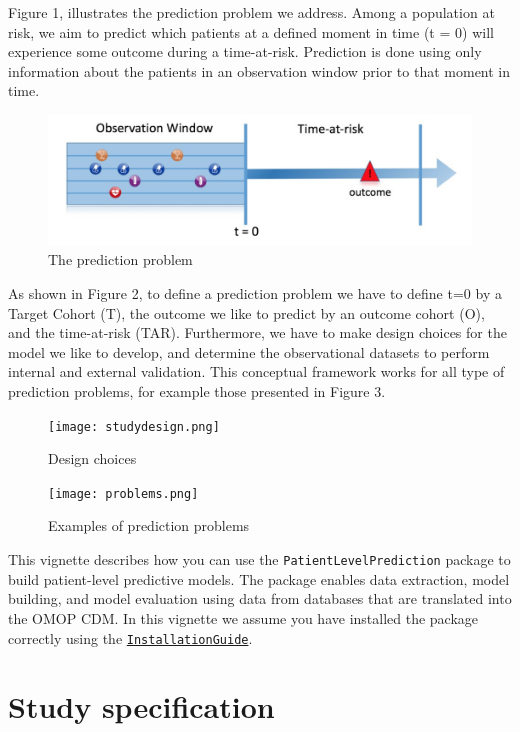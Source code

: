 \documentclass[
]{article}
\begin{document}
Figure 1, illustrates the prediction problem we address. Among a
population at risk, we aim to predict which patients at a defined moment
in time (t = 0) will experience some outcome during a time-at-risk.
Prediction is done using only information about the patients in an
observation window prior to that moment in time.

\begin{figure}
\centering
\includegraphics{Figure1.png}
\caption{The prediction problem}
\end{figure}

As shown in Figure 2, to define a prediction problem we have to define
t=0 by a Target Cohort (T), the outcome we like to predict by an outcome
cohort (O), and the time-at-risk (TAR). Furthermore, we have to make
design choices for the model we like to develop, and determine the
observational datasets to perform internal and external validation. This
conceptual framework works for all type of prediction problems, for
example those presented in Figure 3.

\begin{figure}
\centering
\texttt{[image: studydesign.png]}
\caption{Design choices}
\end{figure}

\begin{figure}
\centering
\texttt{[image: problems.png]}
\caption{Examples of prediction problems}
\end{figure}

This vignette describes how you can use the
\texttt{PatientLevelPrediction} package to build patient-level
predictive models. The package enables data extraction, model building,
and model evaluation using data from databases that are translated into
the OMOP CDM. In this vignette we assume you have installed the package
correctly using the
\href{https://github.com/OHDSI/PatientLevelPrediction/blob/master/inst/doc/InstallationGuide.pdf}{\texttt{InstallationGuide}}.

\hypertarget{study-specification}{%
\section{Study specification}\label{study-specification}}
\end{document}
